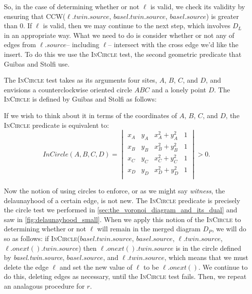 \documentclass[12pt,twoside]{reedthesis}
\begin{document}
    So, in the case of determining whether or not $\ell$ is valid, we check its validity by ensuring that \textsc{CCW}($\ell.twin.source$, $basel.twin.source$, $basel.source$) is greater than 0. If $\ell$ is valid, then we may continue to the next step, which involves  $D_{L}$ in an appropriate way. What we need to do is consider whether or not any of edges from \emph{$\ell.source$}-- including $\ell$-- intersect with the cross edge we'd like the insert. To do this we use the \textsc{InCircle} test, the second geometric predicate that Guibas and Stolfi use. 

    The \textsc{InCircle} test takes as its arguments four sites, $A$, $B$, $C$, and $D$, and envisions a counterclockwise oriented circle $ABC$ and a lonely point $D$. The \textsc{InCircle} is defined by Guibas and Stolfi as follows:  
  
    If we wish to think about it in terms of the coordinates of $A$, $B$, $C$, and $D$, the \textsc{InCircle} predicate is equivalent to:
    $$
    InCircle(A,B,C,D) =
    \begin{vmatrix}
    x_{A} & y_{A} & x_{A}^2 + y_{A}^2 & 1 \\
    x_{B} & y_{B} & x_{B}^2 + y_{B}^2 & 1 \\
    x_{C} & y_{C} & x_{C}^2 + y_{C}^2 & 1 \\  
    x_{D} & y_{D} & x_{D}^2 + y_{D}^2 & 1 \\  
    \end{vmatrix} > 0.
    $$  

    Now the notion of using circles to enforce, or as we might say \emph{witness}, the delaunayhood of a certain edge, is not new. The \textsc{InCircle} predicate is precisely the circle test we performed in \cref{sec:the_voronoi_diagram_and_its_dual} and saw in \cref{fig:delaunayhood_small}. When we apply this notion of the \textsc{InCircle} to determining whether or not $\ell$ will remain in the merged diagram $D_{P}$, we will do so as follows: if \textsc{InCircle}($basel.twin.source$, $basel.source$, $\ell.twin.source$, $\ell.onext().twin.source$) then $\ell.onext().twin.source$ is in the circle defined by \emph{basel.twin.source}, $basel.source$, and $\ell.twin.source$, which means that we must delete the edge $\ell$ and set the new value of $\ell$ to be $\ell.onext()$. We continue to do this, deleting edges as necessary, until the \textsc{InCircle} test fails. Then, we repeat an analagous procedure for $r$.
\end{document}
